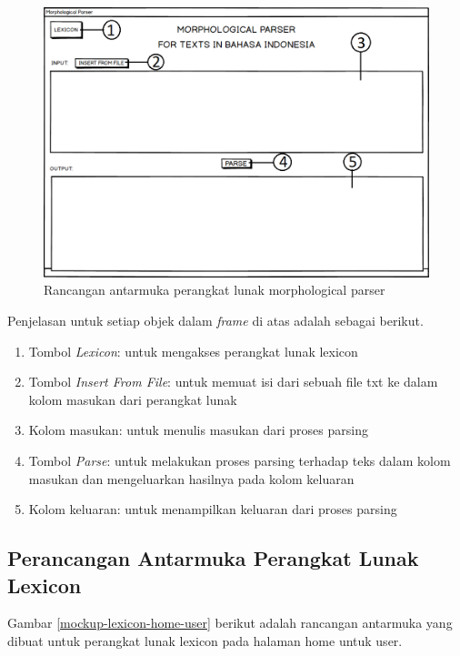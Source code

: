 \begin{figure}[H]
\centering
\includegraphics[scale=0.7]{Gambar/mockup-parser}
\caption{Rancangan antarmuka perangkat lunak morphological parser} 
\label{mockup-parser}
\end{figure}

Penjelasan untuk setiap objek dalam \textit{frame} di atas adalah sebagai berikut.

\begin{enumerate}
	\item Tombol \textit{Lexicon}: untuk mengakses perangkat lunak lexicon
	\item Tombol \textit{Insert From File}: untuk memuat isi dari sebuah file txt ke dalam kolom masukan dari perangkat lunak
	\item Kolom masukan: untuk menulis masukan dari proses parsing
	\item Tombol \textit{Parse}: untuk melakukan proses parsing terhadap teks dalam kolom masukan dan mengeluarkan hasilnya pada kolom keluaran
	\item Kolom keluaran: untuk menampilkan keluaran dari proses parsing
\end{enumerate}

\subsection{Perancangan Antarmuka Perangkat Lunak Lexicon}
\label{sec:antarmukaLexicon}

Gambar \ref{mockup-lexicon-home-user} berikut adalah rancangan antarmuka yang dibuat untuk perangkat lunak lexicon pada halaman home untuk user.

